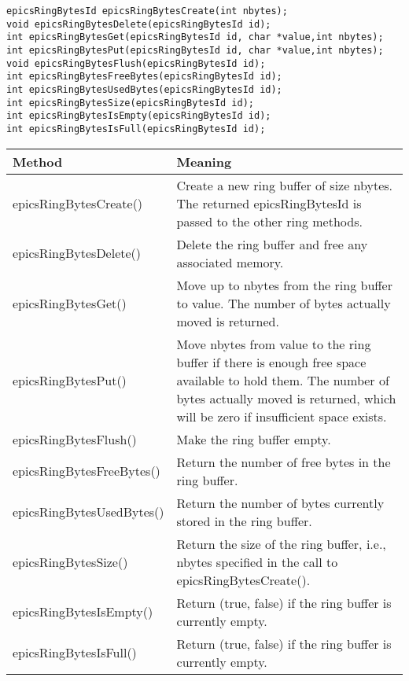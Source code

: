 \begin{verbatim}epicsRingBytesId epicsRingBytesCreate(int nbytes);
void epicsRingBytesDelete(epicsRingBytesId id);
int epicsRingBytesGet(epicsRingBytesId id, char *value,int nbytes);
int epicsRingBytesPut(epicsRingBytesId id, char *value,int nbytes);
void epicsRingBytesFlush(epicsRingBytesId id);
int epicsRingBytesFreeBytes(epicsRingBytesId id);
int epicsRingBytesUsedBytes(epicsRingBytesId id);
int epicsRingBytesSize(epicsRingBytesId id);
int epicsRingBytesIsEmpty(epicsRingBytesId id);
int epicsRingBytesIsFull(epicsRingBytesId id);
\end{verbatim}
\begin{center}\begin{longtable}{p{1.6in}p{5.0in}}
\textbf{Method} & \textbf{Meaning}\\
\hline
epicsRingBytesCreate() & Create a new ring buffer of size nbytes. The returned epicsRingBytesId is passed to the other ring methods.\\
epicsRingBytesDelete() & Delete the ring buffer and free any associated memory.\\
epicsRingBytesGet() & Move up to nbytes from the ring buffer to value. The number of bytes actually moved is returned.\\
epicsRingBytesPut() & Move nbytes from value to the ring buffer if there is enough free space available to hold them. The number of bytes actually moved is returned, which will be zero if insufficient space exists.\\
epicsRingBytesFlush() & Make the ring buffer empty.\\
epicsRingBytesFreeBytes() & Return the number of free bytes in the ring buffer.\\
epicsRingBytesUsedBytes() & Return the number of bytes currently stored in the ring buffer.\\
epicsRingBytesSize() & Return the size of the ring buffer, i.e., nbytes specified in the call to epicsRingBytesCreate().\\
epicsRingBytesIsEmpty() & Return (true, false) if the ring buffer is currently empty.\\
epicsRingBytesIsFull() & Return (true, false) if the ring buffer is currently empty.
\end{longtable}\end{center}


